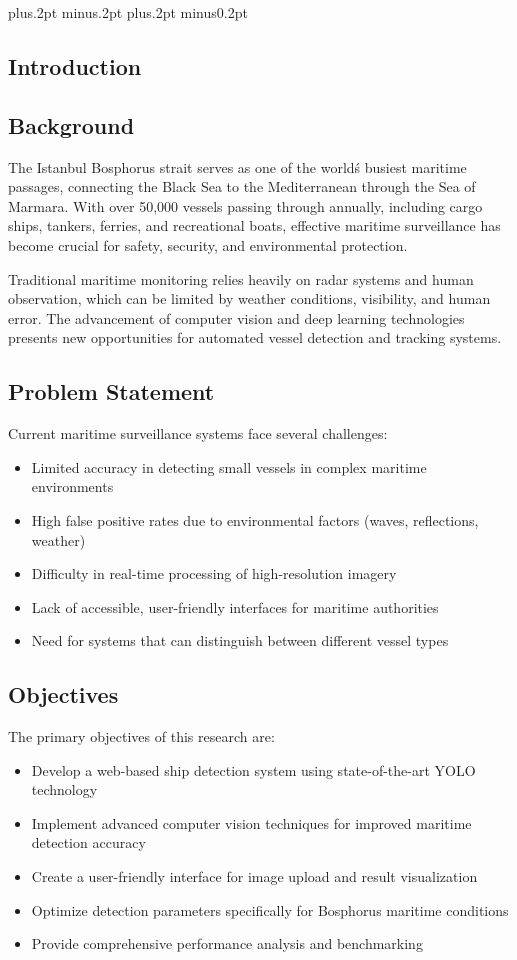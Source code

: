 \documentclass[twoside]{article}
\begin{document}
\baselineskip=18pt plus.2pt minus.2pt
\parskip=0pt plus.2pt minus0.2pt
\begin{multicols}{2}

\section{Introduction}

\subsection{Background}
The Istanbul Bosphorus strait serves as one of the world\'s busiest maritime passages, connecting the Black Sea to the Mediterranean through the Sea of Marmara. With over 50,000 vessels passing through annually, including cargo ships, tankers, ferries, and recreational boats, effective maritime surveillance has become crucial for safety, security, and environmental protection.

Traditional maritime monitoring relies heavily on radar systems and human observation, which can be limited by weather conditions, visibility, and human error. The advancement of computer vision and deep learning technologies presents new opportunities for automated vessel detection and tracking systems.

\subsection{Problem Statement}
Current maritime surveillance systems face several challenges:
\begin{itemize}
    \item Limited accuracy in detecting small vessels in complex maritime environments
    \item High false positive rates due to environmental factors (waves, reflections, weather)
    \item Difficulty in real-time processing of high-resolution imagery
    \item Lack of accessible, user-friendly interfaces for maritime authorities
    \item Need for systems that can distinguish between different vessel types
\end{itemize}

\subsection{Objectives}
The primary objectives of this research are:
\begin{itemize}
    \item Develop a web-based ship detection system using state-of-the-art YOLO technology
    \item Implement advanced computer vision techniques for improved maritime detection accuracy
    \item Create a user-friendly interface for image upload and result visualization
    \item Optimize detection parameters specifically for Bosphorus maritime conditions
    \item Provide comprehensive performance analysis and benchmarking
\end{itemize}


\end{multicols}
\end{document}
